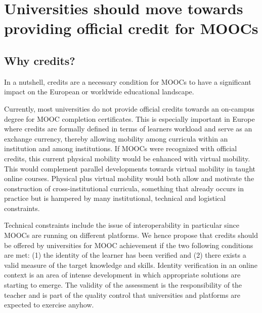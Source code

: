 \section{Universities should move towards providing official credit for MOOCs}
\label{sec:credit}
 

\subsection{Why credits?}

In a nutshell, credits are a necessary condition for MOOCs to have a significant impact on  the European or
worldwide educational landscape. 

Currently, most universities do not provide official credits towards an
on-campus degree for MOOC
completion certificates.
This is especially important in Europe where
credits are formally defined in terms of learners workload and serve as
an exchange currency, thereby allowing mobility among curricula within an
institution and among institutions. If MOOCs were recognized with official
credits, this current physical mobility would be enhanced with 
virtual mobility.  This would complement parallel developments towards virtual mobility in taught online courses.
Physical plus virtual mobility would both allow and motivate
the construction of cross-institutional curricula, something that
already occurs in practice but is hampered by
many institutional, technical and logistical constraints. 


Technical constraints include the issue of interoperability in particular since MOOCs are 
running on different platforms. 
We hence propose that credits should be offered 
by universities for MOOC achievement if the two following conditions are met: (1) the identity of the
learner has been verified and (2) there exists a valid
measure of the target knowledge and skills. Identity verification in an online context
is an area of intense development in which appropriate solutions are
starting to emerge. The validity of the assessment is the responsibility of
the teacher and is part of the quality control that universities and
platforms are expected to exercise anyhow.

